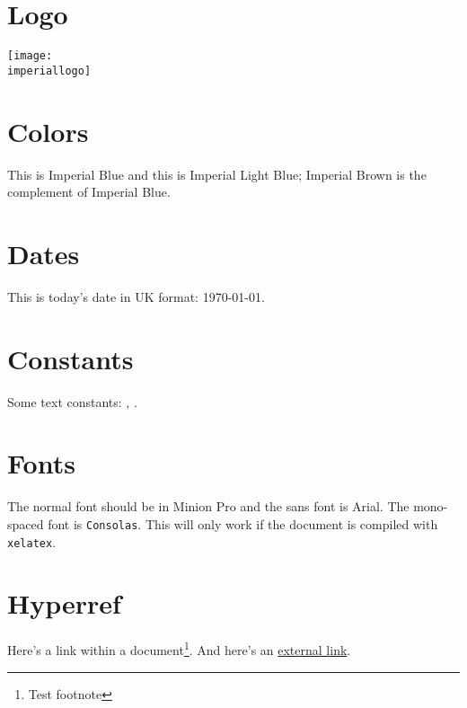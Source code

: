 \documentclass[a4paper]{article}
\begin{document}
\section*{Logo}

\texttt{[image: \\imperiallogo]}

\section*{Colors}
This is \textcolor{ImperialBlue}{Imperial Blue} and this is \textcolor{ImperialLightBlue}{Imperial Light Blue}; \textcolor{ImperialBrown}{Imperial Brown} is the complement of Imperial Blue.

\section*{Dates}
This is today's date in UK format: \today.

\section*{Constants}
Some text constants: \dept, \college.

\section*{Fonts}
The normal font should be in Minion Pro and \textsf{the sans font is Arial}.  The mono-spaced font is \texttt{Consolas}.  This will only work if the document is compiled with \texttt{xelatex}.

\section*{Hyperref}
Here's a link within a document\footnote{Test footnote}.  And here's an \href{http://www.guardian.co.uk}{external link}.
\end{document}
